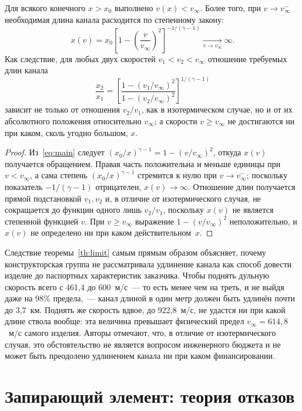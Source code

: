 \documentclass[11pt,a4paper]{article}
\begin{document}
\begin{theorem}\label{th:limit}
Для всякого конечного $x>x_0$ выполнено $v(x)<v_\infty$. Более того, при $v\to v_\infty^{-}$ необходимая длина канала расходится по степенному закону:
\[
x(v) = x_0\left[1-\left(\frac{v}{v_\infty}\right)^2\right]^{-1/(\gamma-1)} \xrightarrow[v\to v_\infty^-]{} \infty .
\]
Как следствие, для любых двух скоростей $v_1<v_2<v_\infty$ отношение требуемых длин канала
\[
\frac{x_2}{x_1}=\left[\frac{1-(v_1/v_\infty)^2}{1-(v_2/v_\infty)^2}\right]^{1/(\gamma-1)}
\]
зависит не только от отношения $v_2/v_1$, как в изотермическом случае, но и от их абсолютного положения относительно $v_\infty$; а скорости $v\ge v_\infty$ не достигаются ни при каком, сколь угодно большом, $x$.
\end{theorem}

\begin{proof}
Из~\eqref{eq:main} следует $(x_0/x)^{\gamma-1}=1-(v/v_\infty)^2$, откуда $x(v)$ получается обращением. Правая часть положительна и меньше единицы при $v<v_\infty$, а сама степень $(x_0/x)^{\gamma-1}$ стремится к нулю при $v\to v_\infty^-$; поскольку показатель $-1/(\gamma-1)$ отрицателен, $x(v)\to\infty$. Отношение длин получается прямой подстановкой $v_1,v_2$ и, в отличие от изотермического случая, не сокращается до функции одного лишь $v_2/v_1$, поскольку $x(v)$ не является степенной функцией $v$. При $v\ge v_\infty$ выражение $1-(v/v_\infty)^2$ неположительно, и $x(v)$ не определено ни при каком действительном~$x$.
\end{proof}

Следствие теоремы~\ref{th:limit} самым прямым образом объясняет, почему конструкторская группа не рассматривала удлинение канала как способ довести изделие до паспортных характеристик заказчика. Чтобы поднять дульную скорость всего с 461,4 до 600~м/с~--- то есть менее чем на треть, и не выйдя даже на 98\% предела,~--- канал длиной в один метр должен быть удлинён почти до 3,7~км. Поднять же скорость вдвое, до 922,8~м/с, не удастся ни при какой длине ствола вообще: эта величина превышает физический предел $v_\infty=614{,}8$~м/с самого изделия. Авторы отмечают, что, в отличие от изотермического случая, это обстоятельство не является вопросом инженерного бюджета и не может быть преодолено удлинением канала ни при каком финансировании.

\section{Запирающий элемент: теория отказов}
\end{document}
